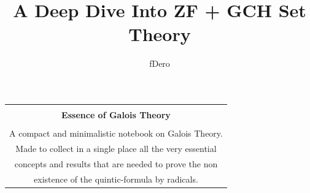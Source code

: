 \title{A Deep Dive Into ZF + GCH Set Theory}
\author{fDero}

\begin{titlepage}
    \begin{center}
        \begin{tabular}{c}
            {}                                                           \\ [200pt]
            {\Huge \bf Essence of Galois Theory}                         \\ [10pt]
            \hline                                                       \\  
            A compact and minimalistic notebook on Galois Theory.        \\ 
            Made to collect in a single place all the very essential     \\ 
            concepts and results that are needed to prove the non        \\ 
            existence of the quintic-formula by radicals.                \\
        \end{tabular}
    \end{center}
\end{titlepage}
\newpage